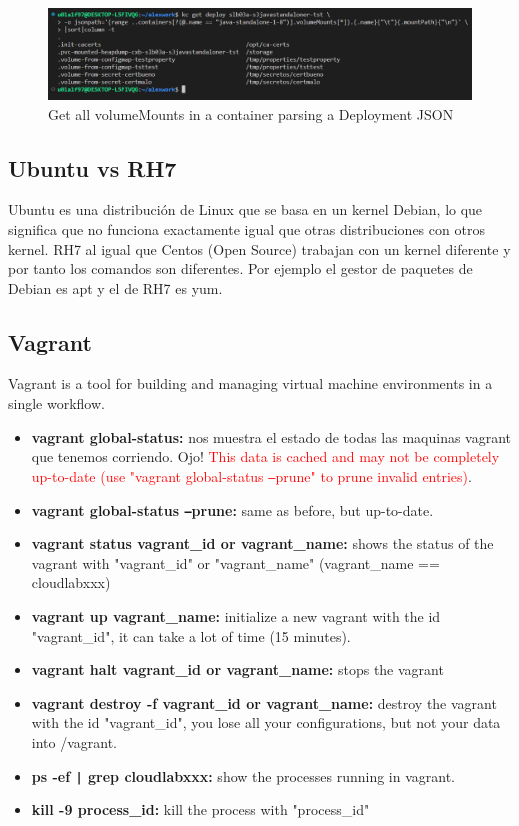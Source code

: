 \documentclass{article}
\begin{document}
\begin{figure}[H]
    \centering
    \includegraphics[scale=0.35]{pictures/image23.png}
    \caption{Get all volumeMounts in a container parsing a Deployment JSON}
    \label{parsing json 5}
\end{figure}

\subsection{Ubuntu vs RH7}
Ubuntu es una distribución de Linux que se basa en un kernel Debian, lo que significa que no funciona exactamente igual que otras distribuciones con otros kernel. RH7 al igual que Centos (Open Source) trabajan con un kernel diferente y por tanto los comandos son diferentes. Por ejemplo el gestor de paquetes de Debian es apt y el de RH7 es yum.

\subsection{Vagrant}
Vagrant is a tool for building and managing virtual machine environments in a single workflow.

\begin{itemize}
    \item \textbf{vagrant global-status:} nos muestra el estado de todas las maquinas vagrant que tenemos corriendo. Ojo! \textcolor{red}{This data is cached and may not be completely up-to-date (use "vagrant global-status \texttt{--}prune" to prune invalid entries)}.
    \item \textbf{vagrant global-status \texttt{--}prune:} same as before, but up-to-date.
   \item \textbf{vagrant status vagrant\_id or vagrant\_name:} shows the status of the vagrant with "vagrant\_id" or "vagrant\_name" (vagrant\_name == cloudlabxxx)
   \item \textbf{vagrant up vagrant\_name:} initialize a new vagrant with the id "vagrant\_id", it can take a lot of time (15 minutes).
   \item \textbf{vagrant halt vagrant\_id or vagrant\_name:} stops the vagrant
   \item \textbf{vagrant destroy -f vagrant\_id or vagrant\_name:} destroy the vagrant with the id "vagrant\_id", you lose all your configurations, but not your data into /vagrant.
   \item \textbf{ps -ef \texttt{|} grep cloudlabxxx:} show the processes running in vagrant.
   \item \textbf{kill -9 process\_id:} kill the process with "process\_id"
\end{itemize}
\end{document}
